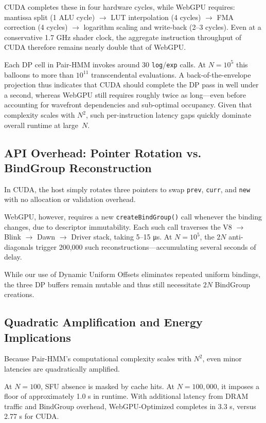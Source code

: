 \documentclass[PhD]{PHlab-thesis}
\begin{document}
CUDA completes these in four hardware cycles, while WebGPU requires:
mantissa split (1 ALU cycle) $\rightarrow$ LUT interpolation (4 cycles) $\rightarrow$ FMA correction (4 cycles) $\rightarrow$ logarithm scaling and write-back (2–3 cycles). Even at a conservative 1.7 GHz shader clock, the aggregate instruction throughput of CUDA therefore remains nearly double that of WebGPU.

Each DP cell in Pair-HMM invokes around 30 \texttt{log}/\texttt{exp} calls. At $N=10^{5}$ this balloons to more than $10^{11}$ transcendental evaluations. A back-of-the-envelope projection thus indicates that CUDA should complete the DP pass in well under a second, whereas WebGPU still requires roughly twice as long—even before accounting for wavefront dependencies and sub-optimal occupancy. Given that complexity scales with $N^{2}$, such per-instruction latency gaps quickly dominate overall runtime at large~$N$.



\subsection{API Overhead: Pointer Rotation vs. BindGroup Reconstruction}
In CUDA, the host simply rotates three pointers to swap \texttt{prev}, \texttt{curr}, and \texttt{new} with no allocation or validation overhead.

WebGPU, however, requires a new \texttt{createBindGroup()} call whenever the binding changes, due to descriptor immutability. Each such call traverses the V8 $\rightarrow$ Blink $\rightarrow$ Dawn $\rightarrow$ Driver stack, taking 5–15 μs. At $N = 10^5$, the $2N$ anti-diagonals trigger 200,000 such reconstructions—accumulating several seconds of delay.

While our use of Dynamic Uniform Offsets eliminates repeated uniform bindings, the three DP buffers remain mutable and thus still necessitate $2N$ BindGroup creations.

\subsection{Quadratic Amplification and Energy Implications}
Because Pair-HMM's computational complexity scales with $N^2$, even minor latencies are quadratically amplified.

At $N = 100$, SFU absence is masked by cache hits. At $N = 100,000$, it imposes a floor of approximately 1.0 s in runtime. With additional latency from DRAM traffic and BindGroup overhead, WebGPU-Optimized completes in 3.3 s, versus 2.77 s for CUDA.
\end{document}
